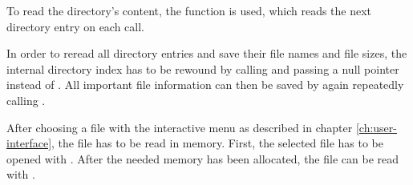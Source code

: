To read the directory's content, the function  is used, which reads the next directory entry on each call. %

In order to reread all directory entries and save their file names and file sizes, the internal directory index has to be rewound by calling  and passing a null pointer instead of . All important file information can then be saved by again repeatedly calling . 

After choosing a file with the interactive menu as described in chapter \ref{ch:user-interface}, the file has to be read in memory. First, the selected file has to be opened with . After the needed memory has been allocated, the file can be read with .